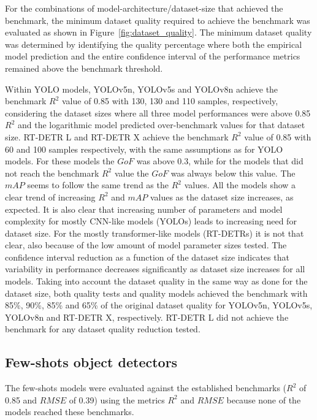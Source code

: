 \documentclass[12pt,a4paper,oneside]{report}
\begin{document}
For the combinations of model-architecture/dataset-size that achieved the benchmark,
the minimum dataset quality required to achieve the benchmark was evaluated as
shown in Figure~\ref{fig:dataset_quality}. The minimum dataset quality was determined by identifying 
the quality percentage where both the empirical model prediction and the entire confidence interval 
of the performance metrics remained above the benchmark threshold.

Within YOLO models, YOLOv5n, YOLOv5s and YOLOv8n achieve the benchmark $R^2$ 
value of 0.85 with 130, 130 and 110 samples, respectively, considering the dataset
sizes where all three model performances were above 0.85 $R^2$ and the logarithmic
model predicted over-benchmark values for that dataset size.
RT-DETR L and RT-DETR X achieve the benchmark $R^2$ value of 0.85 with 60 and 100 samples
respectively, with the same assumptions as for YOLO models.
For these models the $GoF$ was above 0.3, while for the models that did
not reach the benchmark $R^2$ value the $GoF$ was always below this value.
The $mAP$ seems to follow the same trend as the $R^2$ values.
All the models show a clear trend of increasing $R^2$ and $mAP$
values as the dataset size increases, as expected.
It is also clear that increasing number of parameters and model complexity for
mostly CNN-like models (YOLOs) leads to increasing need for dataset size.
For the mostly transformer-like models (RT-DETRs) it is not that clear, also because of
the low amount of model parameter sizes tested.
The confidence interval reduction as a function of the dataset size indicates that 
variability in performance decreases significantly as dataset size increases for 
all models.
Taking into account the dataset quality in the same way as done for the dataset size,
both quality tests and quality models achieved the benchmark with 85\%, 90\%, 85\% and
65\% of the original dataset quality for YOLOv5n, YOLOv5s, YOLOv8n and RT-DETR X, respectively.
RT-DETR L did not achieve the benchmark for any dataset quality reduction tested.

\subsection{Few-shots object detectors}

The few-shots models were evaluated against the established benchmarks ($R^2$ of 0.85 and $RMSE$ of 0.39) 
using the metrics $R^2$ and $RMSE$ because none of the models reached these benchmarks.
\end{document}

